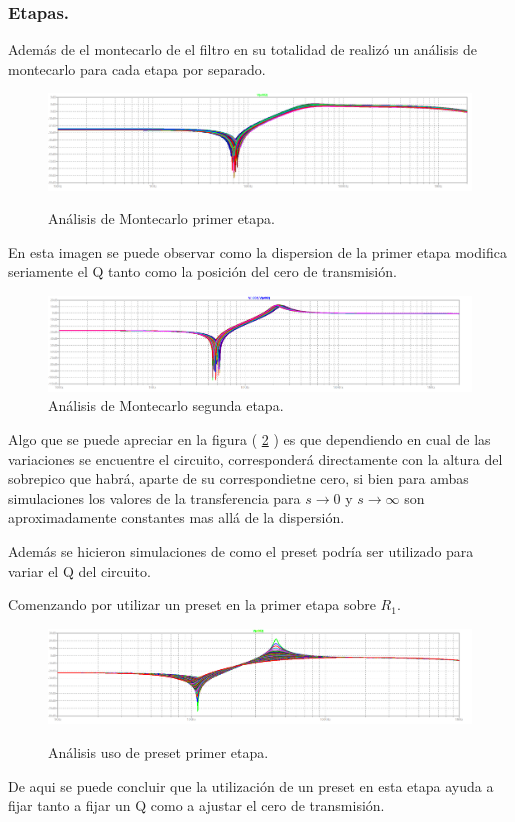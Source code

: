 \subsubsection{Etapas.}
Además de el montecarlo de el filtro en su totalidad de realizó un análisis de montecarlo para cada etapa por separado.
\begin{figure}[H]
	\centering
	\includegraphics[width=\textwidth]{Imagenes-Ej3/mcsedraE1.png}
	\label{fig:mcsedrae1}
	\caption{Análisis de Montecarlo primer etapa.}
\end{figure}
En esta imagen se puede observar como la dispersion de la primer etapa modifica seriamente el Q tanto como la posición del cero de transmisión.
\begin{figure}[H]
	\centering
	\includegraphics[width=\textwidth]{Imagenes-Ej3/mcsedraE2.png}
	\caption{Análisis de Montecarlo segunda etapa.}
	\label{fig:mcsedrae2}
\end{figure}
Algo que se puede apreciar en la figura ( \ref{fig:mcsedrae2} ) es que dependiendo en cual de las variaciones se encuentre el circuito, corresponderá directamente con la altura del sobrepico que habrá, aparte de su correspondietne cero, si bien para ambas simulaciones los valores de la transferencia para $s\rightarrow 0$ y $s\rightarrow \infty$ son aproximadamente constantes mas allá de la dispersión.

Además se hicieron simulaciones de como el preset podría ser utilizado para variar el Q del circuito.

Comenzando por utilizar un preset en la primer etapa sobre $R_1$.
\begin{figure}[H]
	\centering
	\includegraphics[width=\textwidth]{Imagenes-Ej3/mcPoteR6E1.png}
	\label{fig:presete1}
	\caption{Análisis uso de preset primer etapa.}
\end{figure}
De aqui se puede concluir que la utilización de un preset en esta etapa ayuda a fijar tanto a fijar un Q como a ajustar el cero de transmisión.

